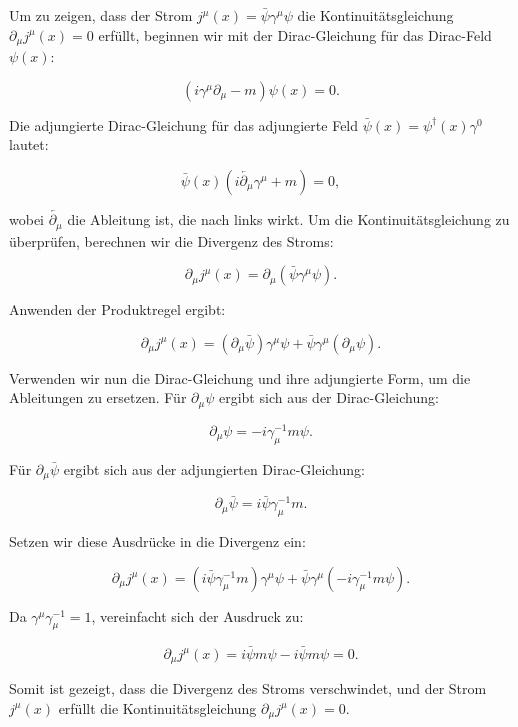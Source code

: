 Um zu zeigen, dass der Strom $j^\mu(x) = \bar{\psi} \gamma^\mu \psi$ die Kontinuitätsgleichung $\partial_\mu j^\mu(x) = 0$ erfüllt, beginnen wir mit der Dirac-Gleichung für das Dirac-Feld $\psi(x)$:

\[
(i \gamma^\mu \partial_\mu - m) \psi(x) = 0.
\]

Die adjungierte Dirac-Gleichung für das adjungierte Feld $\bar{\psi}(x) = \psi^\dagger(x) \gamma^0$ lautet:

\[
\bar{\psi}(x) (i \overleftarrow{\partial_\mu} \gamma^\mu + m) = 0,
\]

wobei $\overleftarrow{\partial_\mu}$ die Ableitung ist, die nach links wirkt. Um die Kontinuitätsgleichung zu überprüfen, berechnen wir die Divergenz des Stroms:

\[
\partial_\mu j^\mu(x) = \partial_\mu (\bar{\psi} \gamma^\mu \psi).
\]

Anwenden der Produktregel ergibt:

\[
\partial_\mu j^\mu(x) = (\partial_\mu \bar{\psi}) \gamma^\mu \psi + \bar{\psi} \gamma^\mu (\partial_\mu \psi).
\]

Verwenden wir nun die Dirac-Gleichung und ihre adjungierte Form, um die Ableitungen zu ersetzen. Für $\partial_\mu \psi$ ergibt sich aus der Dirac-Gleichung:

\[
\partial_\mu \psi = -i \gamma_\mu^{-1} m \psi.
\]

Für $\partial_\mu \bar{\psi}$ ergibt sich aus der adjungierten Dirac-Gleichung:

\[
\partial_\mu \bar{\psi} = i \bar{\psi} \gamma_\mu^{-1} m.
\]

Setzen wir diese Ausdrücke in die Divergenz ein:

\[
\partial_\mu j^\mu(x) = (i \bar{\psi} \gamma_\mu^{-1} m) \gamma^\mu \psi + \bar{\psi} \gamma^\mu (-i \gamma_\mu^{-1} m \psi).
\]

Da $\gamma^\mu \gamma_\mu^{-1} = 1$, vereinfacht sich der Ausdruck zu:

\[
\partial_\mu j^\mu(x) = i \bar{\psi} m \psi - i \bar{\psi} m \psi = 0.
\]

Somit ist gezeigt, dass die Divergenz des Stroms verschwindet, und der Strom $j^\mu(x)$ erfüllt die Kontinuitätsgleichung $\partial_\mu j^\mu(x) = 0$.